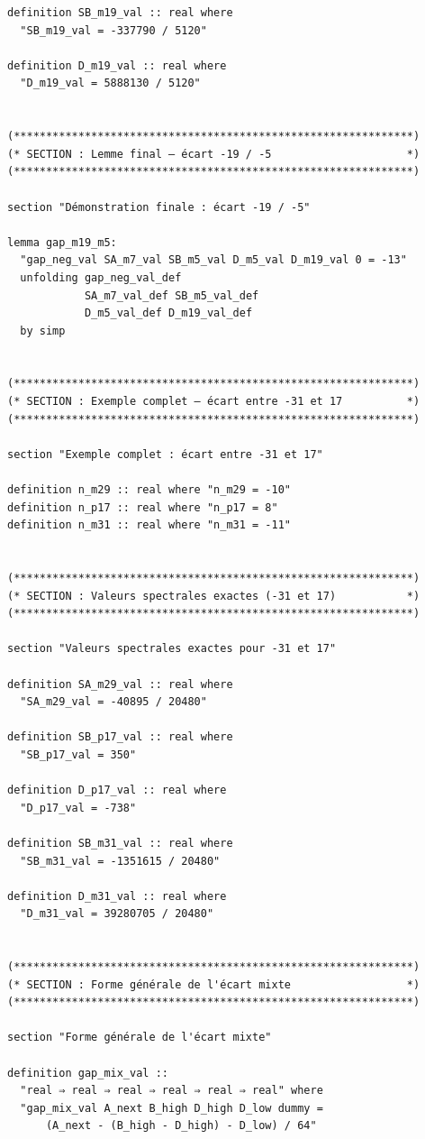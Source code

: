\documentclass[a4paper,11pt]{article}
\begin{document}
\begin{holcode}[title={\textcolor{white}{File: methode\_spectral.thy -- Part 1/4}}]
\begin{lstlisting}
definition SB_m19_val :: real where
  "SB_m19_val = -337790 / 5120"

definition D_m19_val :: real where
  "D_m19_val = 5888130 / 5120"


(**************************************************************)
(* SECTION : Lemme final – écart -19 / -5                     *)
(**************************************************************)

section "Démonstration finale : écart -19 / -5"

lemma gap_m19_m5:
  "gap_neg_val SA_m7_val SB_m5_val D_m5_val D_m19_val 0 = -13"
  unfolding gap_neg_val_def
            SA_m7_val_def SB_m5_val_def
            D_m5_val_def D_m19_val_def
  by simp


(**************************************************************)
(* SECTION : Exemple complet – écart entre -31 et 17          *)
(**************************************************************)

section "Exemple complet : écart entre -31 et 17"

definition n_m29 :: real where "n_m29 = -10"
definition n_p17 :: real where "n_p17 = 8"
definition n_m31 :: real where "n_m31 = -11"


(**************************************************************)
(* SECTION : Valeurs spectrales exactes (-31 et 17)           *)
(**************************************************************)

section "Valeurs spectrales exactes pour -31 et 17"

definition SA_m29_val :: real where
  "SA_m29_val = -40895 / 20480"

definition SB_p17_val :: real where
  "SB_p17_val = 350"

definition D_p17_val :: real where
  "D_p17_val = -738"

definition SB_m31_val :: real where
  "SB_m31_val = -1351615 / 20480"

definition D_m31_val :: real where
  "D_m31_val = 39280705 / 20480"


(**************************************************************)
(* SECTION : Forme générale de l'écart mixte                  *)
(**************************************************************)

section "Forme générale de l'écart mixte"

definition gap_mix_val ::
  "real ⇒ real ⇒ real ⇒ real ⇒ real ⇒ real" where
  "gap_mix_val A_next B_high D_high D_low dummy =
      (A_next - (B_high - D_high) - D_low) / 64"



\end{lstlisting}
\end{holcode}
\end{document}

